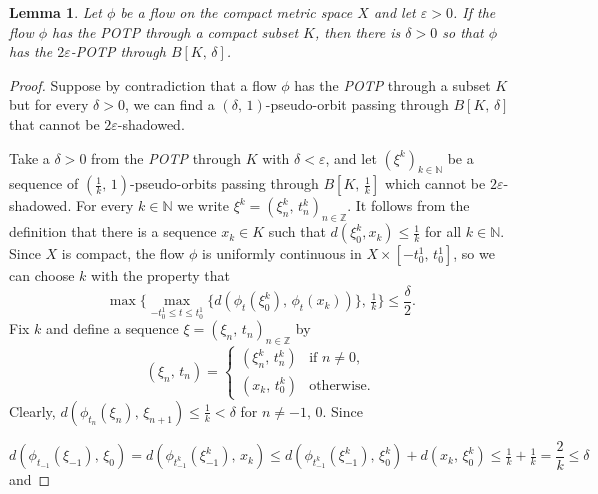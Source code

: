 \documentclass{amsart}
\newtheorem{lemma}[theorem]{Lemma}
\theoremstyle{definition}
\newcommand{\ep}{\varepsilon}
\begin{document}
\begin{lemma}\label{lemma3.7}
Let $\phi$ be a flow  on the compact metric space $X$ and let $\ep>0$. If the flow $\phi$ has the POTP through a compact subset $K$, then there is $\delta > 0$ so that $\phi$ has the $2\ep$-POTP through $B[K,\,\delta]$.
\end{lemma}

\begin{proof}
Suppose by contradiction that a flow $\phi$ has the {\em POTP} through a subset $K$ but for every $\delta > 0$, we can find a $(\delta,\,1)$-pseudo-orbit passing through $B[K,\,\delta]$ that cannot be $2\ep$-shadowed.

Take a $\delta>0$ from the {\em POTP} through $K$ with $\delta <\ep$, and let $(\xi^k)_{k\in\mathbb{N}}$ be a sequence of $(\frac{1}{k},\, 1)$-pseudo-orbits passing through $B[K,\,\frac{1}{k}]$ which cannot be $2\ep$-shadowed. For every $k\in\mathbb{N}$ we write $\xi^k = (\xi_n^k,\, t_n^k)_{n\in\mathbb{Z}}$. It follows from the definition that there is a sequence $x_k\in K$ such that $d(\xi_0^k, x_k)\leq\frac{1}{k}$ for all $k\in\mathbb{N}$. Since $X$ is compact, the flow $\phi$ is uniformly continuous in \sloppy $X\times [-t^1_0,\,t^1_0]$, so we can choose $k$ with the property that \[\max\{\max_{-t_0^1\leq t\leq t_0^1}\{d(\phi_t(\xi_0^k),\,\phi_t(x_k))\},\,\tfrac{1}{k}\}\leq\frac{\delta}{2}.\]
Fix $k$ and define a sequence ${\xi} = ({\xi}_n,\,t_n)_{n\in\mathbb{Z}}$ by
\[
({\xi}_n,\,t_n) = 
\begin{cases}
(\xi_n^k,\,t_n^k) &\mbox{if } n\neq0,\\
(x_k,\, t_0^k) &\mbox{otherwise}.
\end{cases}
\]
Clearly, $d(\phi_{t_n}(\xi_n),\,\xi_{n+1})\leq\frac{1}{k} < \delta$ for $n\neq -1,\,0$. Since

\[
d(\phi_{t_{-1}}(\xi_{-1}),\,\xi_0) = d(\phi_{t_{-1}^k}(\xi_{-1}^k),\,x_k)\leq
			d(\phi_{t_{-1}^k}(\xi_{-1}^k),\, \xi_0^k) + d(x_k,\,\xi_0^k)\leq
			\tfrac{1}{k}+\tfrac{1}{k}=\frac{2}{k}\leq\delta
\]
and 


\end{proof}
\end{document}
